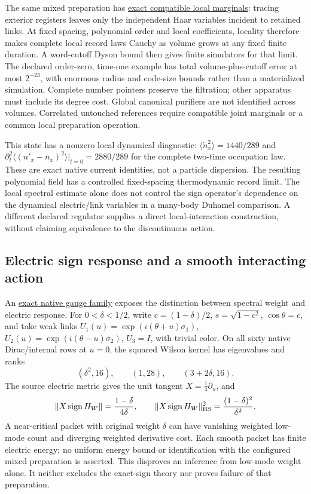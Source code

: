 The same mixed preparation has
\href{https://github.com/FloatingPragma/observer-patch-holography/blob/main/model/particle_local_history_family/PROOF.md}{exact compatible local marginals}:
tracing exterior registers leaves only the independent Haar variables
incident to retained links. At fixed spacing, polynomial order and local
coefficients, locality therefore makes complete local record laws Cauchy
as volume grows at any fixed finite duration. A word-cutoff Dyson bound
then gives finite simulators for that limit. The declared order-zero,
time-one example has total volume-plus-cutoff error at most $2^{-23}$,
with enormous radius and code-size bounds rather than a materialized
simulation. Complete number pointers preserve the filtration; other
apparatus must include its degree cost. Global canonical purifiers are
not identified across volumes. Correlated untouched references require
compatible joint marginals or a common local preparation operation.

This state has a nonzero local dynamical diagnostic:
$\langle\dot n_x^2\rangle=1440/289$ and
$\partial_t^2\langle(n'_x-n_x)^2\rangle|_{t=0}=2880/289$
for the complete two-time occupation law. These are exact native
current identities, not a particle dispersion. The resulting polynomial
field has a controlled fixed-spacing thermodynamic record limit.
The local spectral estimate alone does not control the sign operator's
dependence on the dynamical electric/link variables in a many-body
Duhamel comparison. A different declared regulator supplies a direct
local-interaction construction, without claiming equivalence to the
discontinuous action.

\subsection{Electric sign response and a smooth interacting action}

An \href{https://github.com/FloatingPragma/observer-patch-holography/blob/main/model/particle_sign_response_boundary/PROOF.md}{exact native gauge family}
exposes the distinction between spectral weight and electric response.
For $0<\delta<1/2$, write $c=(1-\delta)/2$, $s=\sqrt{1-c^2}$,
$\cos\theta=c$, and take weak links
$U_1(u)=\exp(i(\theta+u)\sigma_1)$,
$U_2(u)=\exp(i(\theta-u)\sigma_2)$, $U_3=I$, with trivial color.
On all sixty native Dirac/internal rows at $u=0$, the squared Wilson
kernel has eigenvalues and ranks
\[
 (\delta^2,16),\qquad (1,28),\qquad (3+2\delta,16).
\]
The source electric metric gives the unit tangent $X=\tfrac14\partial_u$,
and
\[
 \|X\operatorname{sign}H_W\|=\frac{1-\delta}{4\delta},\qquad
 \|X\operatorname{sign}H_W\|_{\rm HS}^2
       =\frac{(1-\delta)^2}{\delta^2}.
\]
A near-critical packet with original weight $\delta$ can have vanishing
weighted low-mode count and diverging weighted derivative cost.
Each smooth packet has finite electric energy; no uniform energy bound
or identification with the configured mixed preparation is asserted.
This disproves an inference from low-mode weight alone. It neither
excludes the exact-sign theory nor proves failure of that preparation.

